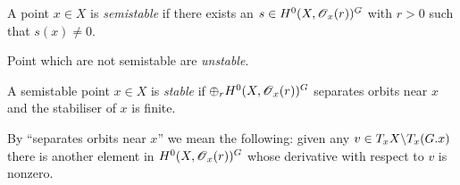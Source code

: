 \documentclass[11pt, english]{article}
\begin{document}
\begin{defi}
A point $x \in X$ is \emph{semistable} if there exists an $s \in H^0(X,\operatorname{\mathscr{O}}_x(r))^G$ with $r > 0$ such that $s(x) \neq 0$.
\end{defi}
Point which are not semistable are \emph{unstable}. 

\begin{defi}
A semistable point $x \in X$ is \emph{stable} if $\oplus_r H^0(X,\operatorname{\mathscr{O}}_x(r))^G$ separates orbits near $x$ and the stabiliser of $x$ is finite.
\end{defi}
By ``separates orbits near $x$'' we mean the following: given any $v \in T_xX \backslash T_x(G.x)$ there is another element in $H^0(X,\operatorname{\mathscr{O}}_x(r))^G$ whose derivative with respect to $v$ is nonzero.


 
\end{document}
